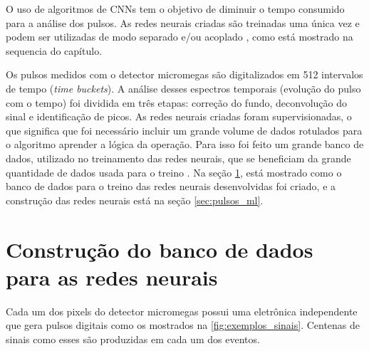 \documentclass[a4paper,12pt,oneside]{book}
\begin{document}
\par O uso de algoritmos de CNNs tem o objetivo de diminuir o tempo consumido para a análise dos pulsos. As redes neurais criadas são treinadas uma única vez e podem ser utilizadas de modo separado e/ou acoplado \cite{FORTINO2022166497}, como está mostrado na sequencia do capítulo.

\par Os pulsos medidos com o detector micromegas são digitalizados em 512 intervalos de tempo (\textit{time buckets}). A análise desses espectros temporais (evolução do pulso com o tempo) foi dividida em três etapas: correção do fundo, deconvolução do sinal e identificação de picos. As redes neurais criadas foram supervisionadas, o que significa que foi necessário incluir um grande volume de dados rotulados para o algoritmo aprender a lógica da operação. Para isso foi feito um grande banco de dados, utilizado no treinamento das redes neurais, que se beneficiam da grande quantidade de dados usada para o treino \cite{mlbook}. Na seção \ref{sec:pulses_trad}, está mostrado como o banco de dados para o treino das redes neurais desenvolvidas foi criado, e a construção das redes neurais está na seção \ref{sec:pulsos_ml}.






\section{Construção do banco de dados para as redes neurais}\label{sec:pulses_trad}

\par Cada um dos pixels do detector micromegas possui uma eletrônica independente que gera pulsos digitais como os mostrados na \ref{fig:exemplos_sinais}. Centenas de sinais como esses são produzidas em cada um dos eventos.
\end{document}
